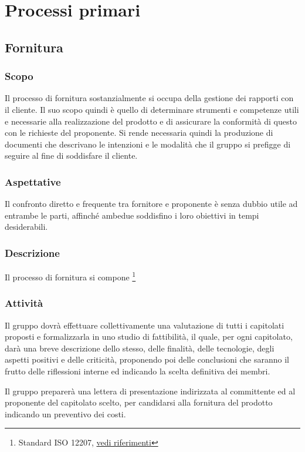 \section{Processi primari}
\subsection{Fornitura}
    \subsubsection{Scopo}
        Il processo di fornitura sostanzialmente si occupa della gestione dei rapporti con il cliente.
        Il suo scopo quindi è quello di determinare strumenti e competenze utili e necessarie alla realizzazione del prodotto e di assicurare la conformità di questo con le richieste del proponente. Si rende necessaria quindi la produzione di documenti che descrivano le intenzioni e le modalità che il gruppo si prefigge di seguire al fine di soddisfare il cliente.
    \subsubsection{Aspettative}
        Il confronto diretto e frequente tra fornitore e proponente è senza dubbio utile ad entrambe le parti, affinché ambedue soddisfino i loro obiettivi in tempi desiderabili.
    \subsubsection{Descrizione}
        Il processo di fornitura si compone \footnote{Standard ISO 12207, \hyperref[ref]{vedi riferimenti}}
    \subsubsection{Attività}
            Il gruppo dovrà effettuare collettivamente una valutazione di tutti i capitolati proposti e formalizzarla in uno studio di fattibilità, il quale, per ogni capitolato, darà una breve descrizione dello stesso, delle finalità, delle tecnologie, degli aspetti positivi e delle criticità, proponendo poi delle conclusioni che saranno il frutto delle riflessioni interne ed indicando la scelta definitiva dei membri.

            Il gruppo preparerà una lettera di presentazione indirizzata al committente ed al proponente del capitolato scelto, per candidarsi alla fornitura del prodotto indicando un preventivo dei costi.

